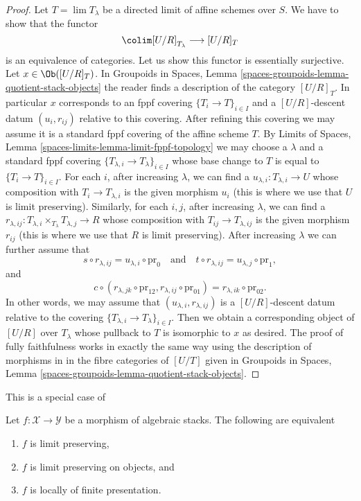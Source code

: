 \begin{proof}
\medskip\noindent
Let $T = \lim T_\lambda$ be a directed limit of affine schemes over $S$.
We have to show that the functor
$$
\colim [U/R]_{T_\lambda} \longrightarrow [U/R]_T
$$
is an equivalence of categories. Let us show this functor is
essentially surjective. Let $x \in \Ob([U/R]_T)$. In
Groupoids in Spaces, Lemma \ref{spaces-groupoids-lemma-quotient-stack-objects}
the reader finds a description of the category $[U/R]_T$.
In particular $x$ corresponds to an fppf covering
$\{T_i \to T\}_{i \in I}$ and a $[U/R]$-descent datum
$(u_i, r_{ij})$ relative to this covering.
After refining this covering we may assume it is a standard
fppf covering of the affine scheme $T$.
By Limits of Spaces, Lemma
\ref{spaces-limits-lemma-limit-fppf-topology}
we may choose a $\lambda$ and a standard fppf covering
$\{T_{\lambda, i} \to T_\lambda\}_{i \in I}$ whose base change to $T$
is equal to $\{T_i \to T\}_{i \in I}$.
For each $i$, after increasing $\lambda$, we can find
a $u_{\lambda, i} : T_{\lambda, i} \to U$ whose composition
with $T_i \to T_{\lambda, i}$ is the given morphism $u_i$
(this is where we use that $U$ is limit preserving).
Similarly, for each $i, j$, after increasing $\lambda$, we can find
a $r_{\lambda, ij} : T_{\lambda, i} \times_{T_\lambda} T_{\lambda, j} \to R$
whose composition with $T_{ij} \to T_{\lambda, ij}$ is the given morphism
$r_{ij}$ (this is where we use that $R$ is limit preserving).
After increasing $\lambda$ we can further assume that
$$
s \circ r_{\lambda, ij} = u_{\lambda, i} \circ \text{pr}_0
\quad\text{and}\quad
t \circ r_{\lambda, ij} = u_{\lambda, j} \circ \text{pr}_1,
$$
and
$$
c \circ (r_{\lambda, jk} \circ \text{pr}_{12}, r_{\lambda, ij}
\circ \text{pr}_{01}) = r_{\lambda, ik} \circ \text{pr}_{02}.
$$
In other words, we may assume that $(u_{\lambda, i}, r_{\lambda, ij})$
is a $[U/R]$-descent datum relative to the covering
$\{T_{\lambda, i} \to T_\lambda\}_{i \in I}$.
Then we obtain a corresponding object of $[U/R]$ over $T_\lambda$
whose pullback to $T$ is isomorphic to $x$ as desired.
The proof of fully faithfulness works in exactly the same
way using the description of morphisms in
in the fibre categories of $[U/T]$ given in
Groupoids in Spaces, Lemma \ref{spaces-groupoids-lemma-quotient-stack-objects}.
\end{proof}

\begin{proposition}
\label{proposition-characterize-locally-finite-presentation}
\begin{reference}
This is a special case of \cite[Lemma 2.3.15]{Emerton-Gee}
\end{reference}
Let $f : \mathcal{X} \to \mathcal{Y}$ be a morphism of algebraic stacks.
The following are equivalent
\begin{enumerate}
\item $f$ is limit preserving,
\item $f$ is limit preserving on objects, and
\item $f$ is locally of finite presentation.
\end{enumerate}
\end{proposition}

